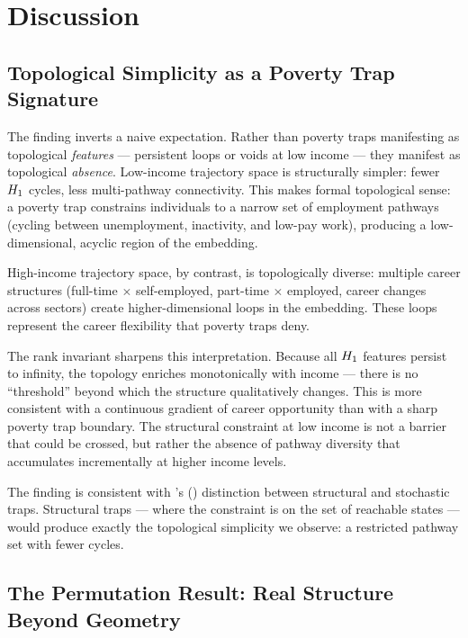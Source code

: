 \section{Discussion}
\label{sec:discussion}

\subsection{Topological Simplicity as a Poverty Trap Signature}

The finding inverts a naive expectation. Rather than poverty traps
manifesting as topological \emph{features} --- persistent loops or voids at
low income --- they manifest as topological \emph{absence}. Low-income
trajectory space is structurally simpler: fewer $H_{1}$ cycles, less
multi-pathway connectivity. This makes formal topological sense: a poverty
trap constrains individuals to a narrow set of employment pathways (cycling
between unemployment, inactivity, and low-pay work), producing a
low-dimensional, acyclic region of the embedding.

High-income trajectory space, by contrast, is topologically diverse: multiple
career structures (full-time $\times$ self-employed, part-time $\times$
employed, career changes across sectors) create higher-dimensional loops in
the embedding. These loops represent the career flexibility that poverty
traps deny.

The rank invariant sharpens this interpretation. Because all $H_{1}$
features persist to infinity, the topology enriches monotonically with income
--- there is no ``threshold'' beyond which the structure qualitatively
changes. This is more consistent with a continuous gradient of career
opportunity than with a sharp poverty trap boundary. The structural
constraint at low income is not a barrier that could be crossed, but rather
the absence of pathway diversity that accumulates incrementally at higher
income levels.

The finding is consistent with \citeauthor{barrett2013economics}'s
(\citeyear{barrett2013economics}) distinction between structural and
stochastic traps. Structural traps --- where the constraint is on the set of
reachable states --- would produce exactly the topological simplicity we
observe: a restricted pathway set with fewer cycles.

\subsection{The Permutation Result: Real Structure Beyond Geometry}

